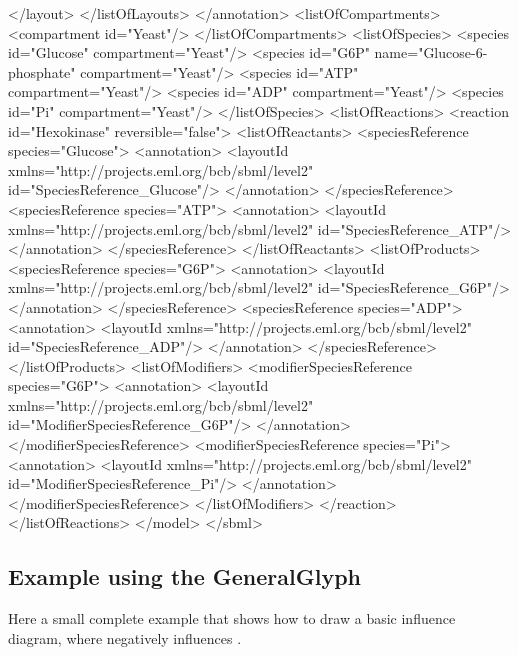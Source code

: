 \begin{example}
       </layout>
     </listOfLayouts>
    </annotation>
    <listOfCompartments>
      <compartment id="Yeast"/>
    </listOfCompartments>
    <listOfSpecies>
      <species id="Glucose" compartment="Yeast"/>
      <species id="G6P" name="Glucose-6-phosphate" compartment="Yeast"/>
      <species id="ATP" compartment="Yeast"/>
      <species id="ADP" compartment="Yeast"/>
      <species id="Pi" compartment="Yeast"/>
    </listOfSpecies>
    <listOfReactions>
      <reaction id="Hexokinase" reversible="false">
        <listOfReactants>
          <speciesReference species="Glucose">
            <annotation>
              <layoutId xmlns="http://projects.eml.org/bcb/sbml/level2"
                        id="SpeciesReference_Glucose"/>
            </annotation>
          </speciesReference>
          <speciesReference species="ATP">
            <annotation>
              <layoutId xmlns="http://projects.eml.org/bcb/sbml/level2" 
                        id="SpeciesReference_ATP"/>
            </annotation>
          </speciesReference>
        </listOfReactants>
        <listOfProducts>
          <speciesReference species="G6P">
            <annotation>
              <layoutId xmlns="http://projects.eml.org/bcb/sbml/level2" 
                        id="SpeciesReference_G6P"/>
            </annotation>
          </speciesReference>
          <speciesReference species="ADP">
            <annotation>
              <layoutId xmlns="http://projects.eml.org/bcb/sbml/level2"
                        id="SpeciesReference_ADP"/>
            </annotation>
          </speciesReference>
        </listOfProducts>
        <listOfModifiers>
          <modifierSpeciesReference species="G6P">
            <annotation>
              <layoutId xmlns="http://projects.eml.org/bcb/sbml/level2"
                        id="ModifierSpeciesReference_G6P"/>
            </annotation>
          </modifierSpeciesReference>
          <modifierSpeciesReference species="Pi">
            <annotation>
              <layoutId xmlns="http://projects.eml.org/bcb/sbml/level2" 
                        id="ModifierSpeciesReference_Pi"/>
            </annotation>
          </modifierSpeciesReference>
        </listOfModifiers>
      </reaction>
    </listOfReactions>
  </model>
</sbml>
\end{example}

\subsection{Example using the GeneralGlyph}
\label{example-generalglyph}
Here a small complete example that shows how to draw a basic influence
diagram, where  negatively influences . 

